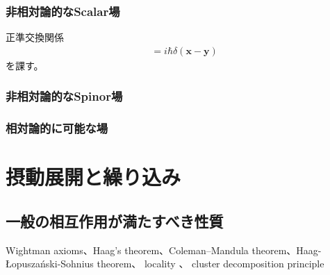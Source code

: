 \subsubsection{非相対論的なScalar場}

正準交換関係
\begin{align}
    [\hat{\phi}(\bm{x}), \hat{\pi}(\bm{y})]
    &=
    i \hbar \delta(\bm{x} - \bm{y})
\end{align}
を課す。

\subsubsection{非相対論的なSpinor場}

\subsubsection{相対論的に可能な場}
\label{representation of Lorentz group}

\section{摂動展開と繰り込み}

\subsection{一般の相互作用が満たすべき性質}
Wightman axioms、Haag's theorem、Coleman–Mandula theorem、Haag-\L{}opusza\'nski-Sohnius theorem、
locality
\label{locality}
、
cluster decomposition principle